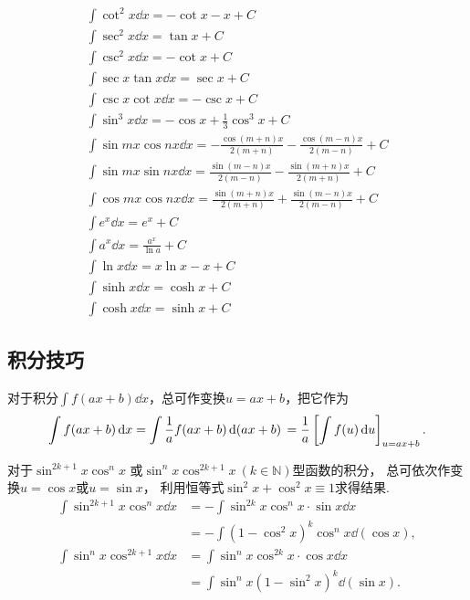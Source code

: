 \begin{gather*}
	\int \cot^2 x \dd{x}
	= -\cot x - x + C \\
	\int \sec^2 x \dd{x}
	= \tan x + C \\
	\int \csc^2 x \dd{x}
	= -\cot x + C \\
	\int \sec x \tan x \dd{x}
	= \sec x + C \\
	\int \csc x \cot x \dd{x}
	= -\csc x + C \\
	\int \sin^3 x \dd{x}
	= -\cos x + \frac{1}{3} \cos^3 x + C \\
	\int \sin mx \cos nx \dd{x}
	= -\frac{\cos(m+n)x}{2(m+n)}
		- \frac{\cos(m-n)x}{2(m-n)}
		+ C \\
	\int \sin mx \sin nx \dd{x}
	= \frac{\sin(m-n)x}{2(m-n)}
		- \frac{\sin(m+n)x}{2(m+n)}
		+ C \\
	\int \cos mx \cos nx \dd{x}
	= \frac{\sin(m+n)x}{2(m+n)}
		+ \frac{\sin(m-n)x}{2(m-n)}
		+ C \\
	\int e^x \dd{x}
	= e^x + C \\
	\int a^x \dd{x}
	= \frac{a^x}{\ln a} + C \\
	\int \ln x \dd{x}
	= x \ln x - x + C \\
	\int \sinh x \dd{x}
	= \cosh x + C \\
	\int \cosh x \dd{x}
	= \sinh x + C
\end{gather*}

\subsection{积分技巧}
对于积分\(\int f(ax+b) \dd{x}\)，总可作变换\(u=ax+b\)，把它作为\begin{equation*}
	\int f(ax+b) \dd{x}
	= \int \frac{1}{a} f(ax+b) \dd{(ax+b)} \\
	= \frac{1}{a} \left[ \int f(u) \dd{u} \right]_{u=ax+b}.
\end{equation*}

对于\(\sin^{2k+1} x \cos^n x\)
或\(\sin^n x \cos^{2k+1} x\ (k \in \mathbb{N})\)型函数的积分，
总可依次作变换\(u=\cos x\)或\(u=\sin x\)，
利用恒等式\(\sin^2 x + \cos^2 x \equiv 1\)求得结果.
\begin{align*}
	\int \sin^{2k+1} x \cos^n x \dd{x}
	&= - \int \sin^{2k} x \cos^n x \cdot \sin x \dd{x} \\
	&= - \int (1-\cos^2 x)^k \cos^n x \dd(\cos x), \\
	\int \sin^n x \cos^{2k+1} x \dd{x}
	&= \int \sin^n x \cos^{2k} x \cdot \cos x \dd{x} \\
	&= \int \sin^n x (1-\sin^2 x)^k \dd(\sin x).
\end{align*}


